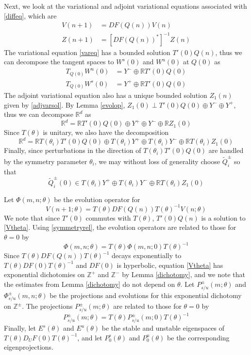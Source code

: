 \documentclass[12pt]{elsarticle}
\def\R{{\mathbb R}}
\def\Z{{\mathbb Z}}
\begin{document}
Next, we look at the variational and adjoint variational equations associated with \eqref{diffeq}, which are
\begin{align}
V(n+1) &= D F(Q(n)) V(n) \label{vareq} \\
Z(n+1) &= [D F(Q(n))^*]^{-1} Z(n) \label{adjvareq} 
\end{align}
The variational equation \eqref{vareq} has a bounded solution $T'(0) Q(n)$, thus we can decompose the tangent spaces to $W^s(0)$ and $W^u(0)$ at $Q(0)$ as
\begin{align*}
T_{Q(0)} W^u(0) &= Y^- \oplus \R T'(0) Q(0) \\
T_{Q(0)} W^s(0) &= Y^+ \oplus \R T'(0) Q(0)
\end{align*}
The adjoint variational equation also has a unique bounded solution $Z_1(n)$ given by \eqref{adjvarsol}. By Lemma \ref{evolop}, $Z_1(0) \perp T'(0) Q(0) \oplus Y^- \oplus Y^+$, thus we can decompose $\R^d$ as
\begin{equation}\label{nontdecomp}
\R^d = \R T'(0) Q(0) \oplus Y^+ \oplus Y^- \oplus \R Z_1(0)
\end{equation}
Since $T(\theta)$ is unitary, we also have the decomposition
\begin{equation}\label{nontdecompT}
\R^d = \R T(\theta_i) T'(0) Q(0) \oplus T(\theta_i) Y^+ \oplus T(\theta_i) Y^- \oplus \R T(\theta_i) Z_1(0)
\end{equation}
Finally, since perturbations in the direction of $T(\theta_i) T'(0) Q(0)$ are handled by the symmetry parameter $\theta_i$, we may without loss of generality choose $\tilde{Q}_i^\pm$ so that 
\begin{equation}\label{W0loc}
\tilde{Q}_i^\pm(0) \in T(\theta_i) Y^+ \oplus T(\theta_i) Y^- \oplus \R T(\theta_i) Z_1(0)
\end{equation}

Let $\Phi(m, n; \theta)$ be the evolution operator for
\begin{equation}\label{Vtheta}
V(n+1; \theta) = T(\theta) D F(Q(n)) T(\theta)^{-1} V(n; \theta) 
\end{equation}
We note that since $T'(0)$ commutes with $T(\theta)$, $T'(0)Q(n)$ is a solution to \eqref{Vtheta}. Using \eqref{symmetryrel}, the evolution operators are related to those for $\theta = 0$ by
\begin{equation}\label{evoloptheta}
\Phi(m, n; \theta) = T(\theta)\Phi(m, n; 0)T(\theta)^{-1}
\end{equation}
Since $T(\theta) D F(Q(n)) T(\theta)^{-1}$ decays exponentially to $T(\theta) D F(0) T(\theta)^{-1}$ and $D F(0)$ is hyperbolic, equation \eqref{Vtheta} has exponential dichotomies on $\Z^+$ and $\Z^-$ by Lemma \ref{dichotomy}, and we note that the estimates from Lemma \ref{dichotomy} do not depend on $\theta$. Let $P_{s/u}^\pm(m; \theta)$ and $\Phi_{s/u}^\pm(m, n; \theta)$ be the projections and evolutions for this exponential dichotomy on $\Z^\pm$. The projections $P_{s/u}^\pm(m; \theta)$ are related to those for $\theta = 0$ by
\[
P_{s/u}^\pm(m; \theta) = T(\theta)P_{s/u}^\pm(m; 0)T(\theta)^{-1}
\]
Finally, let $E^s(\theta)$ and $E^u(\theta)$ be the stable and unstable eigenspaces of $T(\theta) D_U F(0) T(\theta)^{-1}$, and let $P_0^s(\theta)$ and $P_0^u(\theta)$ be the corresponding eigenprojections.
\end{document}
